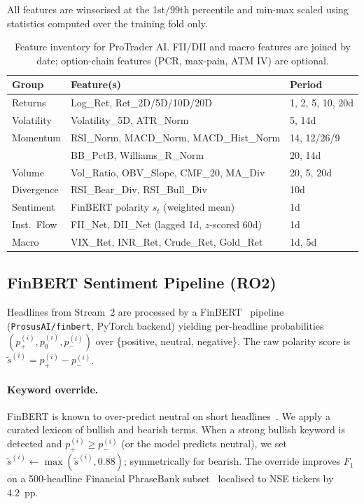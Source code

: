 All features are winsorised at the 1st/99th percentile and min-max scaled
using statistics computed over the training fold only.

\begin{table}[t]
\centering
\caption{Feature inventory for ProTrader AI. FII/DII and macro features are
joined by date; option-chain features (PCR, max-pain, ATM IV) are optional.}
\label{tab:features}
\small
\begin{tabular}{lll}
\toprule
\textbf{Group} & \textbf{Feature(s)} & \textbf{Period} \\
\midrule
Returns   & Log\_Ret, Ret\_2D/5D/10D/20D & 1, 2, 5, 10, 20d \\
Volatility & Volatility\_5D, ATR\_Norm  & 5, 14d \\
Momentum  & RSI\_Norm, MACD\_Norm, MACD\_Hist\_Norm & 14, 12/26/9 \\
          & BB\_PctB, Williams\_R\_Norm & 20, 14d \\
Volume    & Vol\_Ratio, OBV\_Slope, CMF\_20, MA\_Div & 20, 5, 20d \\
Divergence & RSI\_Bear\_Div, RSI\_Bull\_Div & 10d \\
Sentiment & FinBERT polarity $s_t$ (weighted mean) & 1d \\
Inst.\ Flow & FII\_Net, DII\_Net (lagged 1d, $z$-scored 60d) & 1d \\
Macro    & VIX\_Ret, INR\_Ret, Crude\_Ret, Gold\_Ret & 1d, 5d \\
\bottomrule
\end{tabular}
\end{table}

\subsection{FinBERT Sentiment Pipeline (RO2)}
\label{subsec:sentiment}

Headlines from Stream~2 are processed by a FinBERT~\cite{araci2019finbert}
pipeline (\texttt{ProsusAI/finbert}, PyTorch backend) yielding per-headline
probabilities $(p_+^{(i)}, p_0^{(i)}, p_-^{(i)})$ over \{positive, neutral, negative\}.
The raw polarity score is $\tilde{s}^{(i)} = p_+^{(i)} - p_-^{(i)}$.

\paragraph{Keyword override.} FinBERT is known to over-predict neutral on
short headlines~\cite{mishev2020evaluation}. We apply a curated lexicon of
bullish and bearish terms. When a strong bullish keyword is detected and
$p_+^{(i)} \geq p_-^{(i)}$ (or the model predicts neutral), we set
$\tilde{s}^{(i)} \leftarrow \max(\tilde{s}^{(i)}, 0.88)$; symmetrically for
bearish. The override improves $F_1$ on a 500-headline Financial PhraseBank
subset~\cite{malo2014phrasebank} localised to NSE tickers by 4.2~pp.

